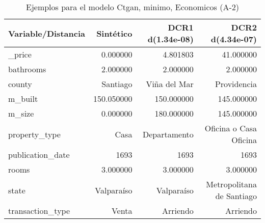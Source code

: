 \begin{table}[H]
\centering
\fontsize{10}{14}\selectfont
\caption{Ejemplos para el modelo Ctgan, minimo, Economicos (A-2)}
\label{table-example-economicos-a-2-ctgan-min}
\begin{tabular}{|l|r|r|r|}
\hline
\rowcolor[gray]{0.8}
Variable/Distancia & Sintético & DCR1 d(1.34e-08) & DCR2 d(4.34e-07) \\
\hline \_price & \cellcolor[rgb]{0.9, 0.54, 0.52} 0.000000 & 4.801803 & 41.000000 \\
\hline bathrooms & \cellcolor[rgb]{0.9, 0.54, 0.52} 2.000000 & \cellcolor[rgb]{0.9, 0.54, 0.52} 2.000000 & \cellcolor[rgb]{0.9, 0.54, 0.52} 2.000000 \\
\hline county & \cellcolor[rgb]{0.9, 0.54, 0.52} Santiago & Viña del Mar & Providencia \\
\hline m\_built & \cellcolor[rgb]{0.9, 0.54, 0.52} 150.050000 & 150.000000 & 145.000000 \\
\hline m\_size & \cellcolor[rgb]{0.9, 0.54, 0.52} 0.000000 & 180.000000 & 145.000000 \\
\hline property\_type & \cellcolor[rgb]{0.9, 0.54, 0.52} Casa & Departamento & Oficina o Casa Oficina \\
\hline publication\_date & \cellcolor[rgb]{0.9, 0.54, 0.52} 1693 & \cellcolor[rgb]{0.9, 0.54, 0.52} 1693 & \cellcolor[rgb]{0.9, 0.54, 0.52} 1693 \\
\hline rooms & \cellcolor[rgb]{0.9, 0.54, 0.52} 3.000000 & \cellcolor[rgb]{0.9, 0.54, 0.52} 3.000000 & \cellcolor[rgb]{0.9, 0.54, 0.52} 3.000000 \\
\hline state & \cellcolor[rgb]{0.9, 0.54, 0.52} Valparaíso & \cellcolor[rgb]{0.9, 0.54, 0.52} Valparaíso & Metropolitana de Santiago \\
\hline transaction\_type & \cellcolor[rgb]{0.9, 0.54, 0.52} Venta & Arriendo & Arriendo \\
\hline
\end{tabular}
\end{table}
